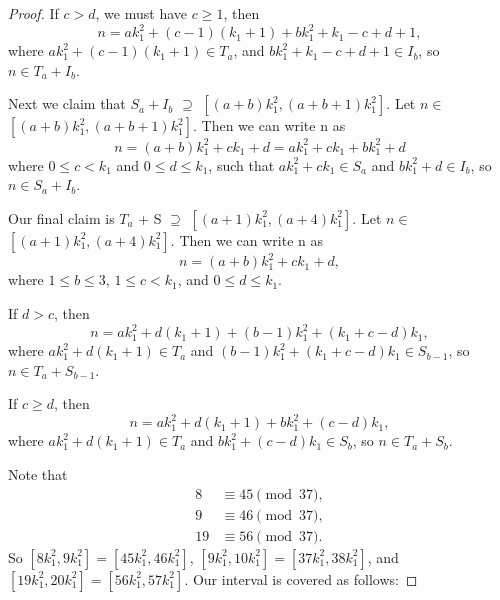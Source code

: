 \begin{proof}
If $c>d$, we must have $c \geq 1$, then
\[
n = ak_1^2 + (c - 1)(k_1 + 1) + bk_1^2 + k_1 -c + d + 1, 
\]
where $ak_1^2 + (c - 1)(k_1 + 1) \in T_a$, and $bk_1^2 + k_1 - c + d + 1 \in I_b$, so $n \in T_a + I_b$. 

Next we claim that  $S_a + I_b$ $\supseteq$ $[(a + b)k_1^2 ,  (a + b + 1)k_1^2]$. Let $n \in$ $[(a + b)k_1^2 ,  (a + b + 1)k_1^2]$.
Then we can write n as 
\[
n = (a + b) k_1^2 + ck_1 + d = ak_1^2 + ck_1 + bk_1^2 + d
\]
where  $0 \leq c < k_1$ and $0 \leq d \leq k_1$, such that $ak_1^2 + ck_1 \in S_a$ and $bk_1^2 + d \in I_b$, so $n \in S_a + I_b$. 

Our final claim is $T_a$ + S $\supseteq$ $[(a +1)k_1^2 ,  (a + 4)k_1^2]$. Let $n \in$ $[(a +1)k_1^2 ,  (a + 4)k_1^2]$.
Then we can write n as 
\[
n = (a + b) k_1^2 + ck_1 + d, 
\]
where $1 \leq b \leq 3$, $1 \leq c < k_1$, and $0 \leq d \leq k_1$. 

If $d > c$, then
\[
n = ak_1^2 + d(k_1 + 1) + (b - 1)k_1^2 + (k_1 + c - d) k_1, 
\]
where $ak_1^2 + d(k_1 + 1) \in T_a$ and $(b - 1)k_1^2 + (k_1 + c - d)k_1 \in S_{b - 1}$, so $n \in T_a + S_{b-1}$. 

If $c \geq d$, then
\[
n = ak_1^2 + d(k_1 + 1) + bk_1^2 + (c - d) k_1, 
\]
where $ak_1^2 + d(k_1 + 1) \in T_a$ and $bk_1^2 + (c - d)k_1 \in S_b$, so $n \in T_a + S_b$. 

Note that
\begin{align*}
8 &\equiv 45\pmod{37},\\
 9 &\equiv 46\pmod{37}, \\
19 &\equiv 56\pmod{37 }.
\end{align*} 
So $[8k_1^2, 9k_1^2] = [45k_1^2, 46k_1^2]$, $[9k_1^2, 10k_1^2] = [37k_1^2, 38k_1^2]$, and $[19k_1^2, 20k_1^2] = [56k_1^2, 57k_1^2]$. 
\newpage
Our interval is covered as follows: 


\end{proof}
